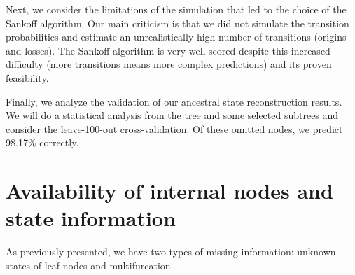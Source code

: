   Next, we consider the limitations of the simulation that led to the choice of the Sankoff 
    algorithm. Our main criticism is that we did not simulate the transition probabilities and 
    estimate an unrealistically high number of transitions (origins and losses). The Sankoff 
    algorithm is very well scored despite this increased difficulty (more transitions means more 
    complex predictions) and its proven feasibility.

  Finally, we analyze the validation of our ancestral state reconstruction results. We will do a 
    statistical analysis from the tree and some selected subtrees and consider the leave-100-out 
    cross-validation. Of these omitted nodes, we predict 98.17\% correctly. \\

  \section{Availability of internal nodes and state information} \label{sec:results - missing information}
    As previously presented, we have two types of missing information: unknown states of leaf nodes 
      and multifurcation.

